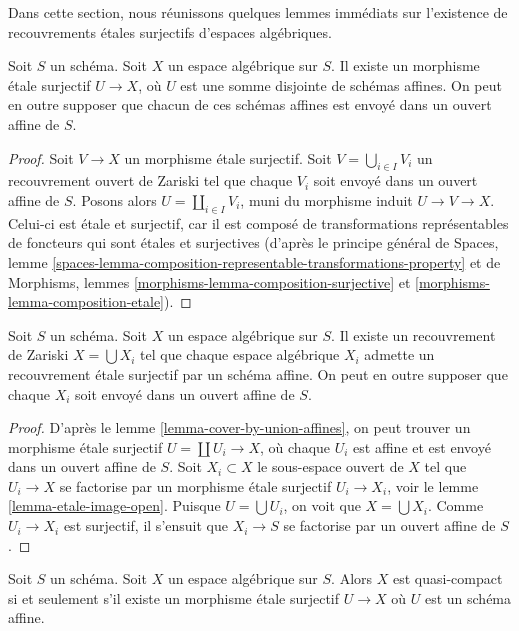 \noindent
Dans cette section, nous réunissons quelques lemmes immédiats sur l'existence
de recouvrements étales surjectifs d'espaces algébriques.

\begin{lemma}
\label{lemma-cover-by-union-affines}
Soit $S$ un schéma.
Soit $X$ un espace algébrique sur $S$.
Il existe un morphisme étale surjectif $U \to X$, où
$U$ est une somme disjointe de schémas affines.
On peut en outre supposer que chacun de ces schémas affines
est envoyé dans un ouvert affine de $S$.
\end{lemma}

\begin{proof}
Soit $V \to X$ un morphisme étale surjectif.
Soit $V = \bigcup_{i \in I} V_i$ un recouvrement ouvert de Zariski
tel que chaque $V_i$ soit envoyé dans un ouvert affine de $S$.
Posons alors $U = \coprod_{i \in I} V_i$, muni du morphisme induit
$U \to V \to X$. Celui-ci est étale et surjectif, car il est composé
de transformations représentables de foncteurs qui sont étales et
surjectives (d'après le principe général de
Spaces, lemme
\ref{spaces-lemma-composition-representable-transformations-property}
et de
Morphisms, lemmes \ref{morphisms-lemma-composition-surjective} et
\ref{morphisms-lemma-composition-etale}).
\end{proof}

\begin{lemma}
\label{lemma-union-of-quasi-compact}
Soit $S$ un schéma.
Soit $X$ un espace algébrique sur $S$.
Il existe un recouvrement de Zariski $X = \bigcup X_i$
tel que chaque espace algébrique $X_i$ admette un recouvrement
étale surjectif par un schéma affine. On peut en outre supposer
que chaque $X_i$ soit envoyé dans un ouvert affine de $S$.
\end{lemma}

\begin{proof}
D'après le lemme \ref{lemma-cover-by-union-affines}, on peut trouver un morphisme
étale surjectif $U = \coprod U_i \to X$, où chaque $U_i$ est affine et est envoyé
dans un ouvert affine de $S$. Soit $X_i \subset X$ le sous-espace ouvert
de $X$ tel que $U_i \to X$ se factorise par un morphisme étale surjectif
$U_i \to X_i$, voir le
lemme \ref{lemma-etale-image-open}.
Puisque $U = \bigcup U_i$, on voit que $X = \bigcup X_i$.
Comme $U_i \to X_i$ est surjectif, il s'ensuit que $X_i \to S$ se factorise par
un ouvert affine de $S$.
\end{proof}

\begin{lemma}
\label{lemma-quasi-compact-affine-cover}
Soit $S$ un schéma.
Soit $X$ un espace algébrique sur $S$.
Alors $X$ est quasi-compact si et seulement s'il
existe un morphisme étale surjectif $U \to X$
où $U$ est un schéma affine.
\end{lemma}

